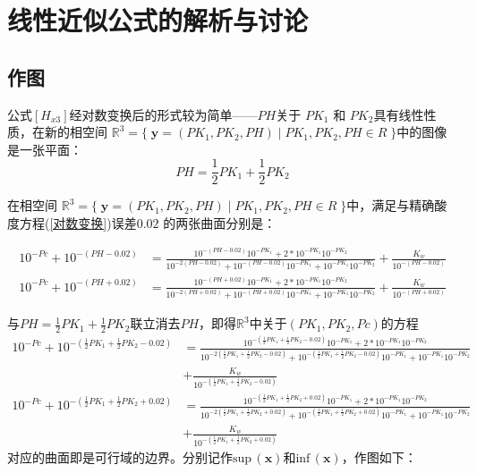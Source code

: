 \documentclass[UTF-8]{ctexart}
\newcommand{\R}{\mathbb{R}}
\newcommand{\0}{\boldsymbol{0}}
\begin{document}
\section{线性近似公式的解析与讨论}
\subsection{作图}
公式$[H_{x3}]$经对数变换后的形式较为简单——$PH $关于 $PK_1$ 和 $PK_2 $具有线性性质，在新的相空间 $\R^3=\{\;\bm{y}= (PK_1,PK_2,PH)\;|\;PK_1,PK_2,PH\in R\;\} $中的图像是一张平面：
\begin{equation*}   
    PH=\frac12PK_1+\frac12PK_2 
\end{equation*}

在相空间 $\R^3=\{\;\bm{y}= (PK_1,PK_2,PH)\;|\;PK_1,PK_2,PH\in R\;\} $中，满足与精确酸度方程(\ref{对数变换})误差$ 0.02$ 的两张曲面分别是：

{\fontsize{9pt}{16pt} 
\begin{align}
    10^{-Pc}+10^{-(PH-0.02)}&= \frac{10^{-(PH-0.02)}10^{-PK_1}+2*10^{-PK_1}10^{-PK_2}} {10^{-2(PH-0.02)}+10^{-(PH-0.02)}10^{-PK_1}+10^{-PK_1}10^{-PK_2}} +\frac{K_w}{10^{-(PH-0.02)}}\\
    10^{-Pc}+10^{-(PH+0.02)}&= \frac{10^{-(PH+0.02)}10^{-PK_1}+2*10^{-PK_1}10^{-PK_2}} {10^{-2(PH+0.02)}+10^{-(PH+0.02)}10^{-PK_1}+10^{-PK_1}10^{-PK_2}} +\frac{K_w}{10^{-(PH+0.02)}}
\end{align}
}

与$PH=\frac12PK_1+\frac12PK_2 $联立消去$PH$，即得$\R^3$中关于$(PK_1,PK_2,Pc)$的方程
{\fontsize{9pt}{14pt}
\begin{align*}
    10^{-Pc}+10^{-(\frac12PK_1+\frac12PK_2 -0.02)}&= \frac{10^{-(\frac12PK_1+\frac12PK_2 -0.02)}10^{-PK_1}+2*10^{-PK_1}10^{-PK_2}} {10^{-2(\frac12PK_1+\frac12PK_2 -0.02)}+10^{-(\frac12PK_1+\frac12PK_2 -0.02)}10^{-PK_1}+10^{-PK_1}10^{-PK_2}} \\
    &+ \frac{K_w}{10^{-(\frac12PK_1+\frac12PK_2 -0.02)}} \\
    10^{-Pc}+10^{-(\frac12PK_1+\frac12PK_2 +0.02)}&= \frac{10^{-(\frac12PK_1+\frac12PK_2 +0.02)}10^{-PK_1}+2*10^{-PK_1}10^{-PK_2}} {10^{-2(\frac12PK_1+\frac12PK_2 +0.02)}+10^{-(\frac12PK_1+\frac12PK_2 +0.02)}10^{-PK_1}+10^{-PK_1}10^{-PK_2}} \\
    &+\frac{K_w}{10^{-(\frac12PK_1+\frac12PK_2 +0.02)}}
\end{align*}
}
对应的曲面即是可行域的边界。分别记作$ \text{sup}\,(\bm{x}) $和$ \text{inf}\,(\bm{x}) $，作图如下：
\end{document}
